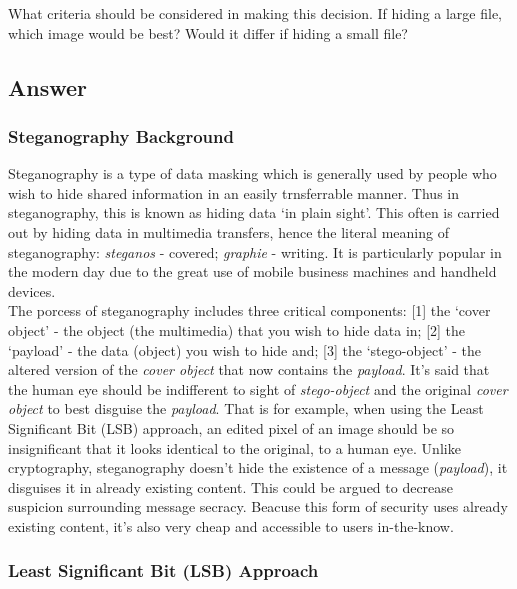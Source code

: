 \documentclass[11pt, english]{article}
\begin{document}
	What criteria should be considered in making this decision. If hiding a large file, which image would be best? Would it differ if hiding a small file?


	\subsection{Answer}

		\subsubsection{Steganography Background}	

	Steganography is a type of data masking which is generally used by people who wish to hide shared information in an easily trnsferrable manner. Thus in steganography, this is known as hiding data `in plain sight'. This often is carried out by hiding data in multimedia transfers, hence the literal meaning of steganography: \textsl{steganos} - covered; \textsl{graphie} - writing. It is particularly popular in the modern day due to the great use of mobile business machines and handheld devices.\\

	The porcess of steganography includes three critical components: [1] the `cover object' - the object (the multimedia) that you wish to hide data in; [2] the `payload' - the data (object) you wish to hide and; [3] the `stego-object' - the altered version of the \textit{cover object} that now contains the \textit{payload}. It's said that the human eye should be indifferent to sight of \textit{stego-object} and the original \textit{cover object} to best disguise the \textit{payload}. That is for example, when using the Least Significant Bit (LSB) approach, an edited pixel of an image should be so insignificant that it looks identical to the original, to a human eye. Unlike cryptography, steganography doesn't hide the existence of a message (\textit{payload}), it disguises it in already existing content. This could be argued to decrease suspicion surrounding message secracy. Beacuse this form of security uses already existing content, it's also very cheap and accessible to users in-the-know.

		\subsubsection{Least Significant Bit (LSB) Approach}
\end{document}
